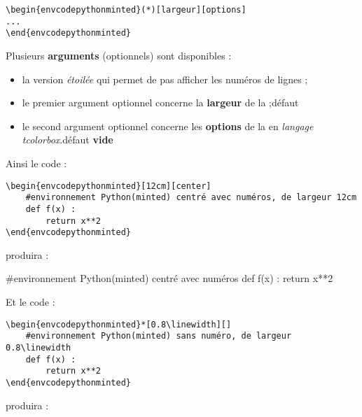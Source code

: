 \documentclass{article}
\newcommand\ctex[1]{\tcbox[vignettelatex]{#1}}
\newcommand\Cle[1]{{\bfseries\sffamily\textlangle #1\textrangle}}
\begin{document}
\begin{verbatim}
\begin{envcodepythonminted}(*)[largeur][options]
...
\end{envcodepythonminted}
\end{verbatim}

Plusieurs \Cle{arguments} (optionnels) sont disponibles :

\begin{itemize}
	\item la version \textit{étoilée} qui permet de pas afficher les numéros de lignes ;
	\item le premier argument optionnel concerne la \Cle{largeur} de la \ctex{tcbox} ;\hfill{}défaut \Cle{12cm}
	\item le second argument optionnel concerne les \Cle{options} de la \ctex{tcbox} en \textit{langage tcolorbox}.\hfill{}défaut \Cle{vide}
\end{itemize}

\medskip

Ainsi le code :

\begin{verbatim}
\begin{envcodepythonminted}[12cm][center]
	#environnement Python(minted) centré avec numéros, de largeur 12cm
	def f(x) :
		return x**2
\end{envcodepythonminted}
\end{verbatim}

produira :

\begin{envcodepythonminted}[12cm][center]
	#environnement Python(minted) centré avec numéros
	def f(x) :
		return x**2
\end{envcodepythonminted}

\medskip

Et le code :

\begin{verbatim}
\begin{envcodepythonminted}*[0.8\linewidth][]
	#environnement Python(minted) sans numéro, de largeur 0.8\linewidth
	def f(x) :
		return x**2
\end{envcodepythonminted}
\end{verbatim}

produira :
\end{document}
